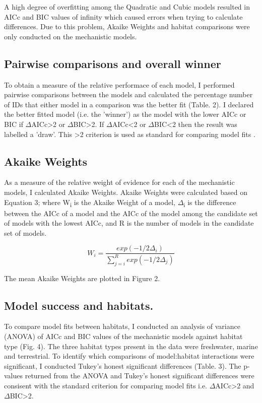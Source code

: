 \documentclass[11pt]{article}
\begin{document}
            A high degree of overfitting among the Quadratic and Cubic models resulted in AICc and BIC values of infinity which caused errors when trying to calculate differences. Due to this problem, Akaike Weights and habitat comparisons were only conducted on the mechanistic models.

        \subsection{Pairwise comparisons and overall winner}
            
            To obtain a measure of the relative performace of each model, I performed pairwise comparisons between the models and calculated the percentage number of IDs that either model in a comparison was the better fit (Table. 2). I declared the better fitted model (i.e. the 'winner') as the model with the lower AICc or BIC if $\Delta$AICc\textgreater2 or $\Delta$BIC\textgreater2. If $\Delta$AICc\textless2 or $\Delta$BIC\textless2 then the result was labelled a 'draw'. This \textgreater2 criterion is used as standard for comparing model fits \citep{johnson2004model}.
            
        \subsection{Akaike Weights}
            As a measure of the relative weight of evidence for each of the mechanistic models, I calculated Akaike Weights. Akaike Weights were calculated based on Equation 3; where W\textsubscript{i} is the Akaike Weight of a model, $\Delta$\textsubscript{i} is the difference between the AICc of a model and the AICc of the model among the candidate set of models with the lowest AICc, and R is the number of models in the candidate set of models.
            
            \begin{equation}
                W_i = \frac{exp(-1/2 \Delta_i)}{\sum\limits_{j=i}^{R} exp(-1/2\Delta_j)}
            \end{equation}

            The mean Akaike Weights are plotted in Figure 2.

        \subsection{Model success and habitats.}
            To compare model fits between habitats, I conducted an analysis of variance (ANOVA) of AICc and BIC values of the mechanistic models against habitat type (Fig. 4). The three habitat types present in the data were freshwater, marine and terrestrial. To identify which comparisons of model:habitat interactions were significant, I conducted Tukey's honest significant differences (Table. 3). The p-values returned from the ANOVA and Tukey's honest significant differences were consisent with the standard criterion for comparing model fits i.e. $\Delta$AICc\textgreater2 and $\Delta$BIC\textgreater2.
\end{document}
